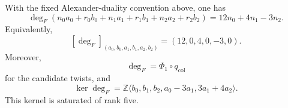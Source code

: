 \begin{theorem}
\label{zdc:thm:fibre-degree}
With the fixed Alexander-duality convention above, one has
\begin{equation}
 \boxed{
 \deg_F(n_0a_0+r_0b_0+n_1a_1+r_1b_1+n_2a_2+r_2b_2)
 =12n_0+4n_1-3n_2.}
 \label{zdc:eq:degree-row}
\end{equation}
Equivalently,
\[
 [\deg_F]_{(a_0,b_0,a_1,b_1,a_2,b_2)}
 =(12,0,4,0,-3,0).
\]
Moreover,
\begin{equation}
 \boxed{\deg_F=\Phi_1\circ q_{\mathrm{col}}}
 \label{zdc:eq:degree-factorization}
\end{equation}
for the candidate twists, and
\begin{equation}
 \boxed{
 \ker\deg_F
 =\mathbb Z\langle
 b_0,b_1,b_2,a_0-3a_1,3a_1+4a_2\rangle.}
 \label{zdc:eq:degree-kernel}
\end{equation}
This kernel is saturated of rank five.
\end{theorem}

